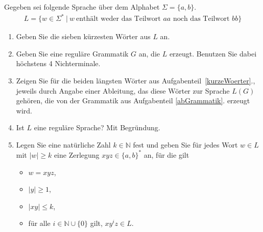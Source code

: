 \documentclass{uebungsblatt}
\begin{document}
\begin{aufgabe}
\medskip
Gegeben sei folgende Sprache über dem Alphabet $\Sigma = \{a,b\}$.
\begin{align*}
L = \{ w \in \Sigma^* \ | \ w\ \mbox{enthält weder das Teilwort $aa$ noch das Teilwort $bb$} \}
\end{align*}

\begin{enumerate}
\item
\label{kurzeWoerter}
Geben Sie die sieben kürzesten Wörter aus $L$ an.\\
\item
\label{abGrammatik}
Geben Sie eine reguläre Grammatik $G$ an, die $L$ erzeugt.
Benutzen Sie dabei höchstens 4 Nichterminale.\\
\item
Zeigen Sie für die beiden längsten Wörter aus Aufgabenteil~\ref{kurzeWoerter}., jeweils
durch Angabe einer Ableitung, das diese Wörter zur Sprache $L(G)$ gehören, die
von der Grammatik aus Aufgabenteil \ref{abGrammatik}. erzeugt wird.\\
\item
Ist $L$ eine reguläre Sprache? Mit Begründung.\\
\item
Legen Sie eine natürliche Zahl $k \in \mathbb{N}$ fest und 
geben Sie für jedes Wort $w \in L$ mit $|w| \ge k$ eine Zerlegung 
$xyz \in \{a, b\}^*$ an, für die gilt
\begin{itemize}
\item
$w = xyz$,
\item
$|y| \ge 1$, 
\item
$|xy| \le k$,
\item
für alle $i \in \mathbb{N} \cup \{0\}$ gilt, $xy^{i}z \in L$.
\end{itemize}
\end{enumerate}
\end{aufgabe}
\begin{loesung}

\end{loesung}
\newpage
\end{document}
